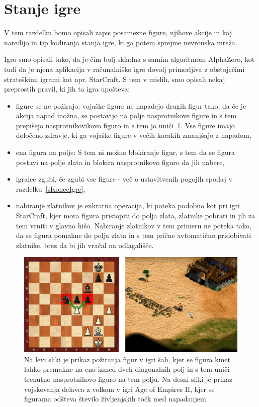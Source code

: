 \documentclass[a4paper, 12pt]{book}
\begin{document}
\section{Stanje igre}
\label{stanjeigre}
V tem razdelku bomo opisali zapis posamezne figure, njihove akcije in kaj naredijo in tip kodiranja stanja igre, ki ga potem sprejme nevronska mreža.

Igro smo opisali tako, da je čim bolj skladna s samim algoritmom AlphaZero, kot tudi da je njena aplikacija v računalniško igro dovolj primerljiva z obstoječimi strateškimi igrami kot npr. StarCraft.
S tem v mislih, smo opisali nekaj preprostih pravil, ki jih ta igra upošteva:
\begin{itemize}
	\item figure se ne požirajo: vojaške figure ne napadejo drugih figur tako, da če je akcija napad možna, se postavijo na polje nasprotnikove figure in s tem prepišejo nasprotnikovikovo figuro in s tem jo uniči~\ref{picPoziranjeFigur}. 
	Vse figure imajo določeno zdravje, ki ga vojaške figure v večih korakih zmanjšajo z napadom,
	\item ena figura na polje: S tem ni možno blokiranje figur, s tem da se figura postavi na polje zlata in blokira nasprotnikovo figuro da jih nabere,
	\item igralec zgubi, če zgubi vse figure - več o ustavitvenih pogojih spodaj v razdelku~\ref{sKonecIgre},
	\item nabiranje zlatnikov je enkratna operacija, ki poteka podobno kot pri igri StarCraft, kjer mora figura pristopiti do polja zlata, zlatnike pobrati in jih za tem vrniti v glavno hišo.
	Nabiranje zlatnikov v tem primeru ne poteka tako, da se figura pomakne do polja zlata in s tem prične avtomatično pridobivati zlatnike, brez da bi jih vračal na odlagališče.
\end{itemize}

\begin{figure}[h!]
	\begin{center}
		\includegraphics[width=1\textwidth]{photos/horizontal_health.pdf}
	\end{center}
	\caption{Na levi sliki je prikaz požiranja figur v igri šah, kjer se figura kmet lahko premakne na eno izmed dveh diagonalnih polj in s tem uniči trenutno nasprotnikovo figuro na tem polju. 
		Na desni sliki je prikaz vojskovanja delavca z volkom v igri Age of Empires II, kjer se figurama odšteva število življenjskih točk med napadanjem.}
	\label{picPoziranjeFigur}
\end{figure}
\end{document}
